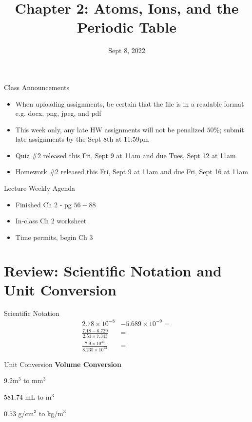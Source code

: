 \documentclass[11pt]{beamer}
\title{Chapter 2: Atoms, Ions, and the Periodic Table}
\institute{Chemistry Department, Cypress College}
\date{Sept 8, 2022}
\begin{document}
\begin{frame}
  \titlepage
\end{frame}

\begin{frame}{Class Announcements}
  \begin{itemize}
  \item When uploading assignments, be certain that
    the file is in a readable format e.g. docx, png, jpeg,
    and pdf
  \item This week only, any late HW assignments will not be
    penalized $50\%$; submit late assignments by the Sept 8th
    at 11:59pm
  \item Quiz \#2 released this Fri, Sept 9 at 11am and due Tues,
    Sept 12 at 11am
  \item Homework \#2 released this Fri, Sept 9 at 11am and due
    Fri, Sept 16 at 11am
  \end{itemize}  
\end{frame}

\begin{frame}{Lecture Weekly Agenda}

  \begin{itemize}
  \item Finished Ch 2 - pg $56 - 88$
  \item In-class Ch 2 worksheet
  \item Time permits, begin Ch 3
  \end{itemize}
\end{frame}

\section{Review: Scientific Notation and Unit Conversion}

\begin{frame}{Scientific Notation}
  \begin{align*}
    2.78 \times 10^{-8} & - 5.689 \times 10^{-9} = \\
    \frac{7.18 - 6.729}{2.51\times 7.343} & = \\
    \frac{7.9\times 10^{34}}{8.235 \times 10^{23}} & =
  \end{align*}
\end{frame}

\begin{frame}{Unit Conversion}
  \textbf{Volume Conversion}

  $9.2 \text{m}^3$ to mm$^3$

  $581.74$ mL to m$^3$

  $0.53$ g/cm$^3$ to kg/m$^3$
\end{frame}
\end{document}
